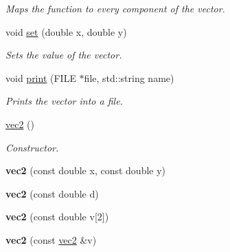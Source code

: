 \begin{DoxyCompactItemize}
\begin{DoxyCompactList}\small\item\em \-Maps the function to every component of the vector. \end{DoxyCompactList}\item 
\hypertarget{classutil_1_1math_1_1vec2_ae6a974371b4c2eaf4eb230207ad9d866}{void \hyperlink{classutil_1_1math_1_1vec2_ae6a974371b4c2eaf4eb230207ad9d866}{set} (double x, double y)}\label{classutil_1_1math_1_1vec2_ae6a974371b4c2eaf4eb230207ad9d866}

\begin{DoxyCompactList}\small\item\em \-Sets the value of the vector. \end{DoxyCompactList}\item 
\hypertarget{classutil_1_1math_1_1vec2_a82af13736db6f94614025a32facf1f9c}{void \hyperlink{classutil_1_1math_1_1vec2_a82af13736db6f94614025a32facf1f9c}{print} (\-F\-I\-L\-E $\ast$file, std\-::string name)}\label{classutil_1_1math_1_1vec2_a82af13736db6f94614025a32facf1f9c}

\begin{DoxyCompactList}\small\item\em \-Prints the vector into a file. \end{DoxyCompactList}\end{DoxyCompactItemize}
{\bf }\par
\begin{DoxyCompactItemize}
\item 
\hypertarget{classutil_1_1math_1_1vec2_ab4e9fb7dc8c8f3b822617657843d970a}{\hyperlink{classutil_1_1math_1_1vec2_ab4e9fb7dc8c8f3b822617657843d970a}{vec2} ()}\label{classutil_1_1math_1_1vec2_ab4e9fb7dc8c8f3b822617657843d970a}

\begin{DoxyCompactList}\small\item\em \-Constructor. \end{DoxyCompactList}\item 
\hypertarget{classutil_1_1math_1_1vec2_a0281180cc2a94899566d87edbb45e214}{{\bfseries vec2} (const double x, const double y)}\label{classutil_1_1math_1_1vec2_a0281180cc2a94899566d87edbb45e214}

\item 
\hypertarget{classutil_1_1math_1_1vec2_aa501b7322c72c0155bdd5236bd397b3e}{{\bfseries vec2} (const double d)}\label{classutil_1_1math_1_1vec2_aa501b7322c72c0155bdd5236bd397b3e}

\item 
\hypertarget{classutil_1_1math_1_1vec2_a67759c5e3719848e3e5aaf8e11103a0a}{{\bfseries vec2} (const double v\mbox{[}2\mbox{]})}\label{classutil_1_1math_1_1vec2_a67759c5e3719848e3e5aaf8e11103a0a}

\item 
\hypertarget{classutil_1_1math_1_1vec2_a2e4c97f36d5362ff6c31160c06d162c6}{{\bfseries vec2} (const \hyperlink{classutil_1_1math_1_1vec2}{vec2} \&v)}\label{classutil_1_1math_1_1vec2_a2e4c97f36d5362ff6c31160c06d162c6}

\end{DoxyCompactItemize}

